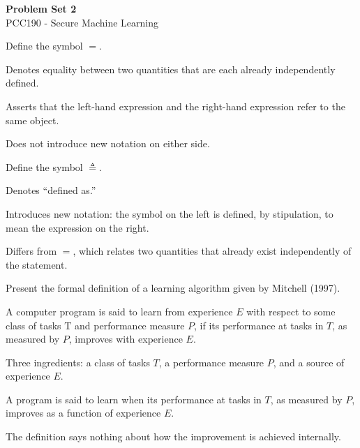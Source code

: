 \documentclass[10pt]{extarticle}
\newcommand{\resposta}[1]{\par\smallskip\noindent #1}
\begin{document}
\begin{center}
    {\LARGE\bfseries\color{darkblue}Problem Set 2}\\[0.3cm]
    {\large\color{accentorange} PCC190 - Secure Machine Learning}\\[0.5cm]
\end{center}


\begin{questoes}

\item Define the symbol $=$.

\resposta{
\begin{topicos}
\item Denotes equality between two quantities that are each already independently defined.
\item Asserts that the left-hand expression and the right-hand expression refer to the same object.
\item Does not introduce new notation on either side.
\end{topicos}
}

\item Define the symbol $\triangleq$.

\resposta{
\begin{topicos}
\item Denotes ``defined as.''
\item Introduces new notation: the symbol on the left is defined, by stipulation, to mean the expression on the right.
\item Differs from $=$, which relates two quantities that already exist independently of the statement.
\end{topicos}
}

\item Present the formal definition of a learning algorithm given by Mitchell (1997).

\resposta{
\begin{topicos}
\item A computer program is said to learn from experience $E$ with respect to some class of tasks T and performance measure $P$, if its performance at tasks in $T$, as measured by $P$, improves with experience $E$.
\item Three ingredients: a class of tasks $T$, a performance measure $P$, and a source of experience $E$.
\item A program is said to learn when its performance at tasks in $T$, as measured by $P$, improves as a function of experience $E$.
\item The definition says nothing about how the improvement is achieved internally.
\end{topicos}
}


\end{questoes}
\end{document}
